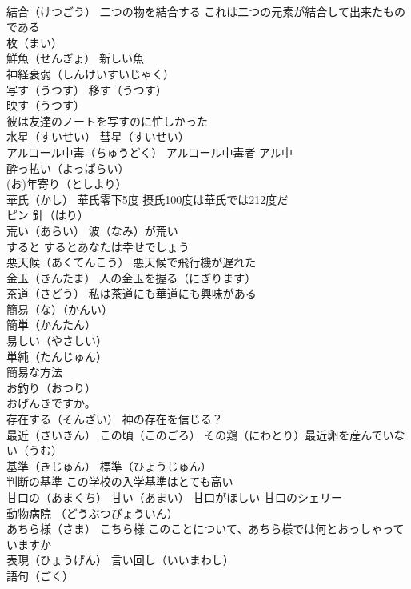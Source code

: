 \documentclass[8pt]{extreport}
\begin{document}
\begin{CJK}{UTF8}{min}
\\	結合（けつごう） 二つの物を結合する これは二つの元素が結合して出来たものである
\\	枚（まい）
\\	鮮魚（せんぎょ） 新しい魚
\\	神経衰弱（しんけいすいじゃく）
\\	写す（うつす） 移す（うつす） 
\\	映す（うつす）
\\	彼は友達のノートを写すのに忙しかった
\\	水星（すいせい） 彗星（すいせい）
\\	アルコール中毒（ちゅうどく） アルコール中毒者 アル中 
\\	酔っ払い（よっぱらい）
\\	(お)年寄り（としより）
\\	華氏（かし） 華氏零下5度 摂氏100度は華氏では212度だ
\\	ピン 針（はり）
\\	荒い（あらい） 波（なみ）が荒い
\\	すると するとあなたは幸せでしょう
\\	悪天候（あくてんこう） 悪天候で飛行機が遅れた
\\	金玉（きんたま） 人の金玉を握る（にぎります）
\\	茶道（さどう） 私は茶道にも華道にも興味がある
\\	簡易（な）（かんい）
\\	簡単（かんたん）
\\	易しい（やさしい）
\\	単純（たんじゅん） 
\\	簡易な方法
\\	お釣り（おつり）
\\	おげんきですか。
\\	存在する（そんざい） 神の存在を信じる？
\\	最近（さいきん） この頃（このごろ） その鶏（にわとり）最近卵を産んでいない（うむ）
\\	基準（きじゅん） 標準（ひょうじゅん）
\\	判断の基準 この学校の入学基準はとても高い
\\	甘口の（あまくち） 甘い（あまい） 甘口がほしい 甘口のシェリー
\\	動物病院 （どうぶつびょういん）
\\	あちら様（さま） こちら様 このことについて、あちら様では何とおっしゃっていますか
\\	表現（ひょうげん） 言い回し（いいまわし）
\\	語句（ごく） 

\end{CJK}
\end{document}
